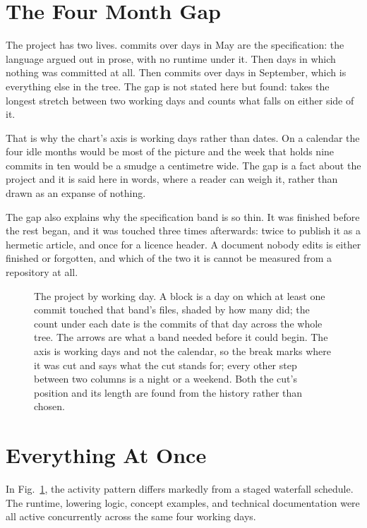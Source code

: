\documentclass[journal,onecolumn,9pt]{IEEEtran}
\begin{document}
\section{The Four Month Gap}
\label{sec:d-gap}

The project has two lives. \ganttbefore{} commits over
\ganttbeforedays{} days in May are the specification: the language
argued out in prose, with no runtime under it. Then \ganttgapdays{}
days in which nothing was committed at all. Then \ganttafter{}
commits over \ganttafterdays{} days in September, which is
everything else in the tree. The gap is not stated here but found:
 takes the longest stretch between two working
days and counts what falls on either side of it.

That is why the chart's axis is working days rather than dates. On a
calendar the four idle months would be most of the picture and the
week that holds nine commits in ten would be a smudge a centimetre
wide. The gap is a fact about the project and it is said here in
words, where a reader can weigh it, rather than drawn as an expanse
of nothing.

The gap also explains why the specification band is so thin. It was
finished before the rest began, and it was touched three times
afterwards: twice to publish it as a hermetic article, and once for a
licence header. A document nobody edits is either finished or
forgotten, and which of the two it is cannot be measured from a
repository at all.

\begin{figure}[t]
\centering

\caption{The project by working day. A block is a day on which at
least one commit touched that band's files, shaded by how many did;
the count under each date is the commits of that day across the whole
tree. The arrows are what a band needed before it could begin. The
axis is working days and not the calendar, so the break marks where
it was cut and says what the cut stands for; every other step between
two columns is a night or a weekend. Both the cut's position and its
length are found from the history rather than chosen.}
\label{fig:d-gantt}
\end{figure}

\section{Everything At Once}
\label{sec:d-together}

In Fig.~\ref{fig:d-gantt}, the activity pattern differs markedly from
a staged waterfall schedule. The runtime, lowering logic, concept
examples, and technical documentation were all active concurrently across
the same four working days.
\end{document}

